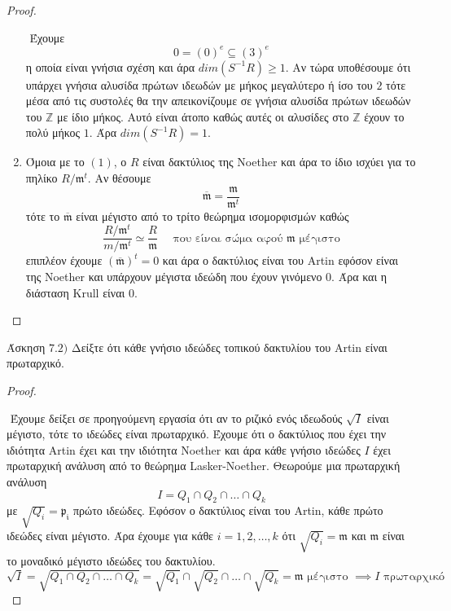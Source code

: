 \documentclass[oneside,a4paper]{article}
\newcommand {\tl}{\textlatin}
\begin{document}
\begin{proof}
\begin{enumerate}
		$ $\newline
		Έχουμε $$0 = (0)^e \subseteq (3)^e$$ η οποία είναι γνήσια σχέση και άρα $dim(S^{-1}R) \geq 1$. Αν τώρα υποθέσουμε ότι υπάρχει γνήσια αλυσίδα πρώτων ιδεωδών με μήκος μεγαλύτερο ή ίσο του $2$ τότε μέσα από τις συστολές θα την απεικονίζουμε σε γνήσια αλυσίδα πρώτων ιδεωδών του $\mathbb{Z}$ με ίδιο μήκος. Αυτό είναι άτοπο καθώς αυτές οι αλυσίδες στο $\mathbb{Z}$ έχουν το πολύ μήκος $1$. Άρα $dim(S^{-1}R) = 1$.
		\vspace*{0.5cm}
		\item Όμοια με το $(1)$, ο $R$ είναι δακτύλιος της \tl{Noether} και άρα το ίδιο ισχύει για το πηλίκο $R/\mathfrak{m}^t$. Αν θέσουμε $$\overline{\mathfrak{m}} = \frac{\mathfrak{m}}{\mathfrak{m}^t}$$ τότε το $\overline{\mathfrak{m}}$ είναι μέγιστο από το τρίτο θεώρημα ισομορφισμών καθώς $$\frac{R/\mathfrak{m}^t}{m/\mathfrak{m}^t} \simeq \frac{R}{\mathfrak{m}} \quad \text{ που είναι σώμα αφού } \mathfrak{m} \text{ μέγιστο}$$ επιπλέον έχουμε $(\overline{\mathfrak{m}})^t = 0$ και άρα ο δακτύλιος είναι του \tl{Artin} εφόσον είναι της \tl{Noether} και υπάρχουν μέγιστα ιδεώδη που έχουν γινόμενο $0$. Άρα και η διάσταση \tl{Krull} είναι $0$.
	\end{enumerate}
\end{proof}
\pagebreak

\noindent Άσκηση $7.2)$
\quad Δείξτε ότι κάθε γνήσιο ιδεώδες τοπικού δακτυλίου του \tl{Artin} είναι πρωταρχικό.
\vspace*{1cm}
\begin{proof} $ $

	$ $\newline
	Έχουμε δείξει σε προηγούμενη εργασία ότι αν το ριζικό ενός ιδεωδούς $\sqrt{I}$ είναι μέγιστο, τότε το ιδεώδες είναι πρωταρχικό. Έχουμε ότι ο δακτύλιος που έχει την ιδιότητα \tl{Artin} έχει και την ιδιότητα \tl{Noether} και άρα κάθε γνήσιο ιδεώδες $I$ έχει πρωταρχική ανάλυση από το θεώρημα \tl{Lasker-Noether}. Θεωρούμε μια πρωταρχική ανάλυση $$I= Q_1 \cap Q_2 \cap \ldots \cap Q_k$$ με $\sqrt{Q_i} = \mathfrak{p_i}$ πρώτο ιδεώδες. Εφόσον ο δακτύλιος είναι του \tl{Artin}, κάθε πρώτο ιδεώδες είναι μέγιστο. Άρα έχουμε για κάθε $i = 1,2,\ldots,k$ ότι $\sqrt{Q_i} = \mathfrak{m}$ και $\mathfrak{m}$ είναι το μοναδικό μέγιστο ιδεώδες του δακτυλίου.
	$$\sqrt{I} = \sqrt{Q_1 \cap Q_2 \cap \ldots \cap Q_k} = \sqrt{Q_1} \cap \sqrt{Q_2} \cap \ldots \cap \sqrt{Q_k} = \mathfrak{m} \text{ μέγιστο } \implies I \text{ πρωταρχικό }$$
\end{proof}
\pagebreak
\end{document}
